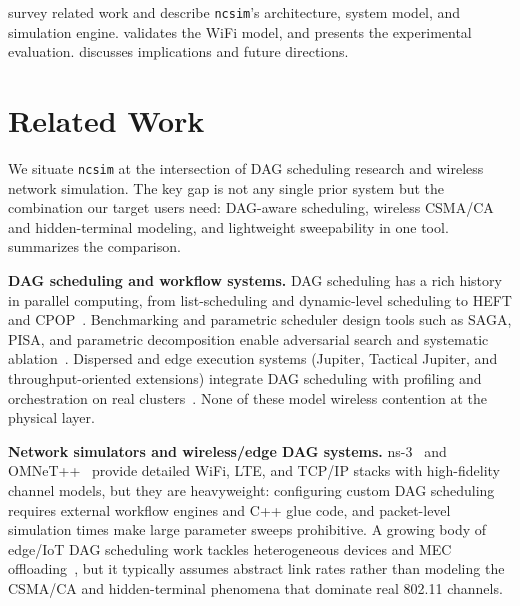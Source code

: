 \documentclass[conference]{IEEEtran}
\newcommand{\ncsim}{\texttt{ncsim}}
\begin{document}
 survey related work and
describe \ncsim{}'s architecture, system model, and simulation engine.
 validates the WiFi model, and 
presents the experimental evaluation.   discusses
implications and future directions.


\section{Related Work}
\label{sec:related}

We situate \ncsim{} at the intersection of DAG scheduling research and
wireless network simulation.  The key gap is not any single prior system
but the combination our target users need: DAG-aware scheduling, wireless
CSMA/CA and hidden-terminal modeling, and lightweight sweepability in one
tool.   summarizes the comparison.

\textbf{DAG scheduling and workflow systems.}
DAG scheduling has a rich history in parallel computing, from
list-scheduling and dynamic-level scheduling to HEFT and
CPOP~\cite{Adam1974ListSchedules,KwokAhmad1999Survey,Sih1993DLS,heft}.
Benchmarking and parametric scheduler design tools such as SAGA, PISA,
and parametric decomposition enable adversarial search and systematic
ablation~\cite{Coleman2024PISA,SAGARepo,Coleman2024Parametric}.
Dispersed and edge execution systems (Jupiter, Tactical Jupiter, and
throughput-oriented extensions) integrate DAG scheduling with
profiling and orchestration on real
clusters~\cite{Ghosh2021Jupiter,Poylisher2021TacticalJupiter,Zhao2021TPHEFT}.
None of these model wireless contention at the physical layer.

\textbf{Network simulators and wireless/edge DAG systems.}
ns-3~\cite{ns3} and OMNeT++~\cite{omnetpp} provide detailed WiFi, LTE,
and TCP/IP stacks with high-fidelity channel models, but they are
heavyweight: configuring custom DAG scheduling requires external workflow
engines and C++ glue code, and packet-level simulation times make large
parameter sweeps prohibitive.  A growing body of edge/IoT DAG scheduling
work tackles heterogeneous devices and MEC
offloading~\cite{Suryavansh2020IBOT,Li2022IBDASH,Li2024MTEC,Yi2017LAVEA,Zhang2019HeteroEdge,Lin2019Petrel,Liang2021JointOffloading,Li2024EnergyConstrained,Long2025SecDS,Chiang2016FogIoT,Chiang2017Fog10Q,Kim2020CodedEdge},
but it typically assumes abstract link rates rather than modeling the
CSMA/CA and hidden-terminal phenomena that dominate real 802.11 channels.
\end{document}
